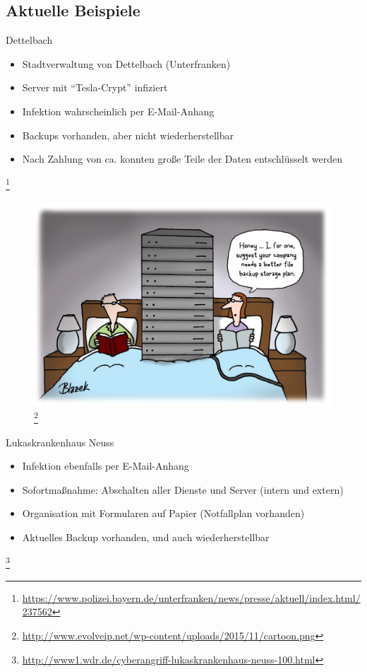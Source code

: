 \documentclass[10pt]{beamer}
\begin{document}
\subsection{Aktuelle Beispiele}
\begin{frame}{Dettelbach}
	\begin{itemize}
		\item Stadtverwaltung von Dettelbach (Unterfranken)
		\item Server mit "`Tesla-Crypt"' infiziert
		\item Infektion wahrscheinlich per E-Mail-Anhang
		\item Backups vorhanden\pause , aber nicht wiederherstellbar
		\item Nach Zahlung von ca.  konnten große Teile der Daten entschlüsselt werden
	\end{itemize}

	\let\thefootnote\relax\footnote{\url{https://www.polizei.bayern.de/unterfranken/news/presse/aktuell/index.html/237562}}
\end{frame}
\begin{frame}[plain]
	\begin{figure}[p]
		\centering
		\includegraphics[scale=0.55]{backup_cartoon.png}
		\let\thefootnote\relax\footnote{\url{http://www.evolveip.net/wp-content/uploads/2015/11/cartoon.png}}
	\end{figure}
\end{frame}

\begin{frame}{Lukaskrankenhaus Neuss}

	\begin{itemize}
		\item Infektion ebenfalls per E-Mail-Anhang
		\item Sofortmaßnahme: Abschalten aller Dienste und Server (intern und extern) \pause
		\item Organisation mit Formularen auf Papier (Notfallplan vorhanden)
		\item Aktuelles Backup vorhanden\pause , und auch wiederherstellbar
	\end{itemize}
	\let\thefootnote\relax\footnote{\url{http://www1.wdr.de/cyberangriff-lukaskrankenhaus-neuss-100.html}}
\end{frame}
\end{document}
